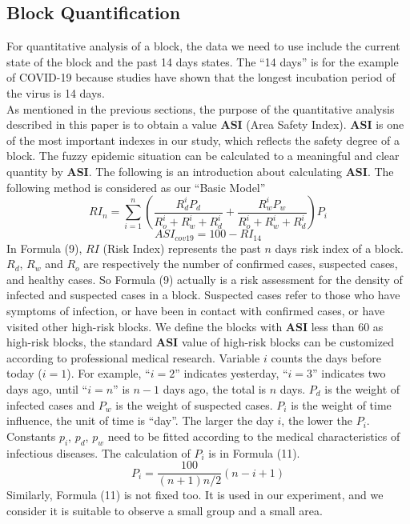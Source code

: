 \documentclass[sigplan,screen]{acmart}
\begin{document}
\subsection{Block Quantification}
For quantitative analysis of a block, the data we need to use include the current state of the block and the past 14 days states.
The ``14 days'' is for the example of COVID-19 because studies have shown that the longest incubation period of the virus is 14 days\cite{lauer2020incubation}.
\\
As mentioned in the previous sections, the purpose of the quantitative analysis described in this paper is to obtain a value \textbf{ASI} (Area Safety Index).
\textbf{ASI} is one of the most important indexes in our study, which reflects the safety degree of a block.
The fuzzy epidemic situation can be calculated to a meaningful and clear quantity by \textbf{ASI}.
The following is an introduction about calculating \textbf{ASI}.
The following method is considered as our ``Basic Model''
\begin{equation}
	RI_n=\sum_{i=1}^n\left(\frac{R_d^iP_d}{R_o^i+R_w^i+R_d^i}+\frac{R_w^iP_w}{R_o^i+R_w^i+R_d^i}\right)P_i
\end{equation}
\begin{equation}
	ASI_{cov19}=100-RI_{14}
\end{equation}
In Formula (9), $RI$ (Risk Index) represents the past $n$ days risk index of a block.
$R_d$, $R_w$ and $R_o$ are respectively the number of confirmed cases, suspected cases, and healthy cases.
So Formula (9) actually is a risk assessment for the density of infected and suspected cases in a block.
Suspected cases refer to those who have symptoms of infection, or have been in contact with confirmed cases, or have visited other high-risk blocks.
We define the blocks with \textbf{ASI} less than 60 as high-risk blocks, the standard \textbf{ASI} value of high-risk blocks can be customized according to professional medical research.
Variable $i$ counts the days before today ($i=1$).
For example, ``$i=2$'' indicates yesterday, ``$i=3$'' indicates two days ago, until ``$i=n$'' is $n-1$ days ago, the total is $n$ days.
$P_d$ is the weight of infected cases and $P_w$ is the weight of suspected cases.
$P_i$ is the weight of time influence, the unit of time is ``day''.
The larger the day $i$, the lower the $P_i$.
Constants $p_i$, $p_d$, $p_w$ need to be fitted according to the medical characteristics of infectious diseases.
The calculation of $P_i$ is in Formula (11).
\begin{equation}
	P_i=\frac{100}{(n+1)n/2}(n-i+1)
\end{equation}
Similarly, Formula (11) is not fixed too.
It is used in our experiment, and we consider it is suitable to observe a small group and a small area.
\\
\end{document}
